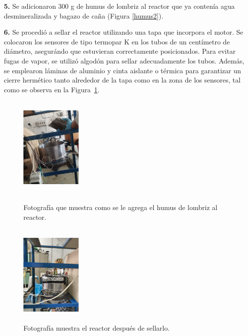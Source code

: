 \documentclass[12pt]{article}
\begin{document}
			\textbf{5.}	Se adicionaron 300 g de humus de lombriz al reactor que ya contenía agua desmineralizada y bagazo de caña (Figura \ref{humus2}).
			

			\textbf{6.} Se procedió a sellar el reactor utilizando una tapa que incorpora el motor. Se colocaron los sensores de tipo termopar K en los tubos de un centímetro de diámetro, asegurándo que estuvieran correctamente posicionados. Para evitar fugas de vapor, se utilizó algodón para sellar adecuadamente los tubos. Además, se emplearon láminas de aluminio y cinta aislante o térmica para garantizar un cierre hermético tanto alrededor de la tapa como en la zona de los sensores, tal como se observa en la Figura~\ref{cellado del reactor}.
			
		
			
	\begin{figure}[H]
		\centering
		\begin{minipage}{0.46\textwidth}
			\centering
			\includegraphics[width=3cm, height=5cm]{imagenes/humus2} %
			\caption{Fotografía que muestra como se le agrega el humus de lombriz al reactor.}
				\label{humus2}
			\end{minipage}
			\hfill
			\begin{minipage}{0.48\textwidth}
				\centering
				\includegraphics[width=3cm, height=5cm]{imagenes/cellado del reactor} %
				\caption{Fotografía muestra el reactor después de sellarlo.}
				\label{cellado del reactor}
			\end{minipage}
		\end{figure}
		
\end{document}
